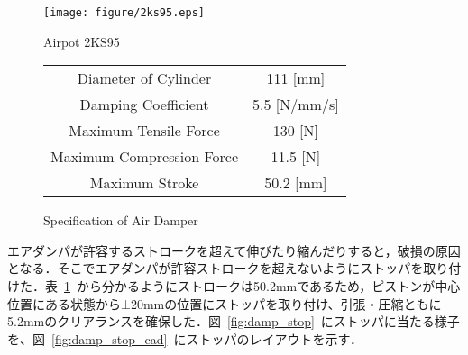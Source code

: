 \documentclass[a4paper,12pt]{article_vdlab_sotsuron}
\begin{document}
\vspace*{10mm}
\begin{figure}[htp]
  \begin{minipage}{0.5\textwidth}
    \begin{center}
      \texttt{[image: figure/2ks95.eps]}
      \vspace*{3mm}
      \caption{Airpot 2KS95}
      \label{fig:2ks95}
    \end{center}
  \end{minipage}
  \begin{minipage}{0.5\textwidth}
      \begin{center}
	\makeatletter
	\def\@captype{table}   
	\makeatother
	\caption{Specification of Air Damper}
	\label{tab:2ks95}
	  \begin{tabular}{cc}\hline
	    Diameter of Cylinder & 111 [mm] \\
	    Damping Coefficient & 5.5 [N/mm/s] \\
	    Maximum Tensile Force & 130 [N] \\
	    Maximum Compression Force & 11.5 [N] \\
	    Maximum Stroke & 50.2 [mm] \\\hline
	  \end{tabular}  
	\end{center}
  \end{minipage}
\end{figure}

\newpage
エアダンパが許容するストロークを超えて伸びたり縮んだりすると，破損の原因となる．そこでエアダンパが許容ストロークを超えないようにストッパを取り付けた．表~\ref{tab:2ks95}~から分かるようにストロークは50.2mmであるため，ピストンが中心位置にある状態から±20mmの位置にストッパを取り付け、引張・圧縮ともに5.2mmのクリアランスを確保した．図~\ref{fig:damp_stop}~にストッパに当たる様子を、図~\ref{fig:damp_stop_cad}~にストッパのレイアウトを示す．
\end{document}
